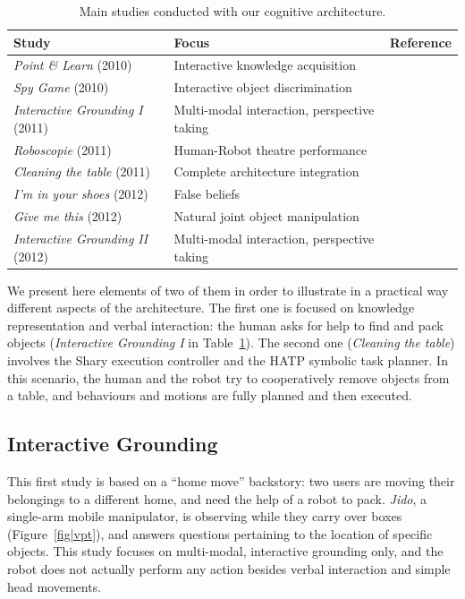 \documentclass[preprint,3p,times]{elsarticle}
\begin{document}
\begin{table}
\begin{center}

\begin{tabular}{lll}
 \bf{Study} & Focus & Reference \\
\hline
{\it Point \& Learn} (2010) & Interactive knowledge acquisition & \cite{Lemaignan2010} \\
{\it Spy Game} (2010) & Interactive object discrimination & \cite{Ros2010b} \\
{\it Interactive Grounding I} (2011) & Multi-modal interaction, perspective taking & \cite{lemaignan2011what} \\
{\it Roboscopie} (2011) & Human-Robot theatre performance & \cite{lemaignan2012roboscopie} \\
{\it Cleaning the table} (2011) & Complete architecture integration & \cite{Alami2011} \\
{\it I'm in your shoes} (2012) & False beliefs & \cite{warnier2012when} \\
{\it Give me this} (2012) & Natural joint object manipulation & \cite{gharbi2013natural} \\
{\it Interactive Grounding II} (2012) & Multi-modal interaction, perspective taking & \cite{lemaignan2013talking} \\
\hline

\end{tabular}
\end{center}
\caption{Main studies conducted with our cognitive architecture.}
\label{table|experiments}
\end{table}

We present here elements of two of them in order to illustrate in a practical way
different aspects of the architecture.  The first one is focused on knowledge
representation and verbal interaction: the human asks for help to find and pack
objects ({\it Interactive Grounding I} in Table~\ref{table|experiments}). The
second one ({\it Cleaning the table}) involves the {\sc Shary} execution
controller and the HATP symbolic task planner. In this scenario, the human and
the robot try to cooperatively remove objects from a table, and behaviours and
motions are fully planned and then executed.

\subsection{Interactive Grounding}
\label{moving-london}

This first study is based on a ``home move'' backstory: two users are moving
their belongings to a different home, and need the help of a robot to pack.
\emph{Jido}, a single-arm mobile manipulator, is observing while they carry
over boxes (Figure~\ref{fig|vpt}), and answers questions pertaining to the
location of specific objects.  This study focuses on multi-modal, interactive
grounding only, and the robot does not actually perform any action besides
verbal interaction and simple head movements.
\end{document}
